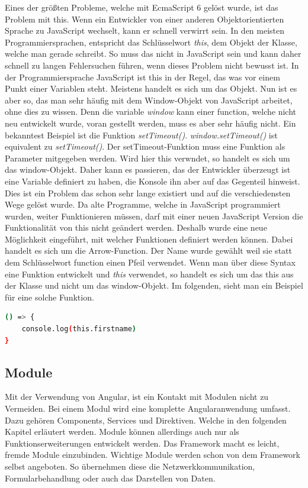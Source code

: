 Eines der größten Probleme, welche mit EcmaScript 6 gelöst wurde, ist das Problem mit this. Wenn ein Entwickler von einer anderen Objektorientierten Sprache zu JavaScript wechselt, kann er schnell verwirrt sein. In den meisten Programmiersprachen, entspricht das Schlüsselwort \textit{this}, dem Objekt der Klasse, welche man gerade schreibt. So muss das nicht in JavaScript sein und kann daher schnell zu langen Fehlersuchen führen, wenn dieses Problem nicht bewusst ist. In der Programmiersprache JavaScript ist this in der Regel, das was vor einem Punkt einer Variablen steht. Meistens handelt es sich um das Objekt. Nun ist es aber so, das man sehr häufig mit dem Window-Objekt von JavaScript arbeitet, ohne dies zu wissen. Denn die variable \textit{window} kann einer function, welche nicht neu entwickelt wurde, voran gestellt werden, muss es aber sehr häufig nicht. Ein bekanntest Beispiel ist die Funktion \textit{setTimeout()}. \textit{window.setTimeout()} ist equivalent zu \textit{setTimeout()}. Der setTimeout-Funktion muss eine Funktion als Parameter mitgegeben werden. Wird hier this verwndet, so handelt es sich um das window-Objekt. Daher kann es passieren, das der Entwickler überzeugt ist eine Variable definiert zu haben, die Konsole ihn aber auf das Gegenteil hinweist. Dies ist ein Problem das schon sehr lange existiert und auf die verschiedensten Wege gelöst wurde. Da alte Programme, welche in JavaScript programmiert wurden, weiter Funktionieren müssen, darf mit einer neuen JavaScript Version die Funktionalität von this nicht geändert werden. Deshalb wurde eine neue Möglichkeit eingeführt, mit welcher Funktionen definiert werden können. Dabei handelt es sich um die Arrow-Function. Der Name wurde gewählt weil sie statt dem Schlüsselwort function einen Pfeil verwendet. Wenn man über diese Syntax eine Funktion entwickelt und \textit{this} verwendet, so handelt es sich um das this aus der Klasse und nicht um das window-Objekt. Im folgenden, sieht man ein Beispiel für eine solche Funktion.

\begin{lstlisting}[language=sh, frame=single]
() => {
	console.log(this.firstname)
}
\end{lstlisting} 



\subsection{Module}
Mit der Verwendung von Angular, ist ein Kontakt mit Modulen nicht zu Vermeiden. Bei einem Modul wird eine komplette Angularanwendung umfasst. Dazu gehören Components, Services und Direktiven. Welche in den folgenden Kapitel erläutert werden. Module können allerdings auch nur als Funktionserweiterungen entwickelt werden.\autocite{Clow.2018} Das Framework macht es leicht, fremde Module einzubinden. Wichtige Module werden schon von dem Framework selbst angeboten. So übernehmen diese die Netzwerkkommunikation, Formularbehandlung oder auch das Darstellen von Daten. 



